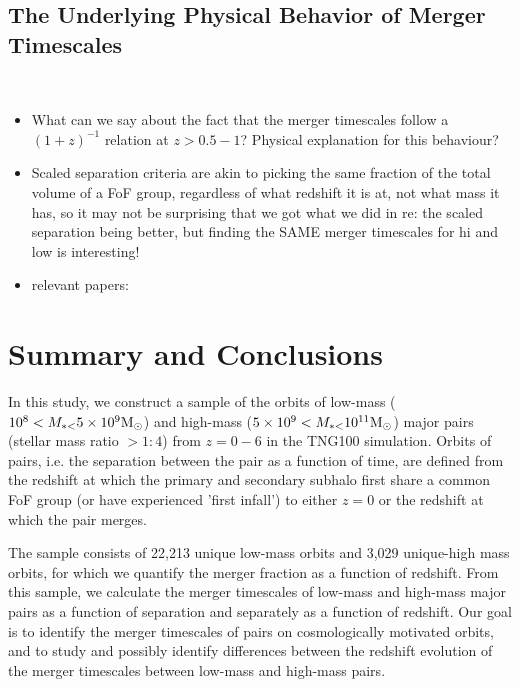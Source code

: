 \documentclass[twocolumn,linenumbers]{aastex631}
\begin{document}
   \subsection{The Underlying Physical Behavior of Merger Timescales}~\label{sec:disc-phys}


        \begin{itemize}
            \item What can we say about the fact that the merger timescales follow a $(1+z)^{-1}$ relation at $z>0.5-1$? Physical explanation for this behaviour? 
            \item Scaled separation criteria are akin to picking the same fraction of the total volume of a FoF group, regardless of what redshift it is at, not what mass it has, so it may not be surprising that we got what we did in re: the scaled separation being better, but finding the SAME merger timescales for hi and low is interesting!
            \item relevant papers: 
        \end{itemize}

    

   
    
\section{Summary and Conclusions}
    In this study, we construct a sample of the orbits of low-mass ($10^8 <M_{*{<}}5\times10^{9}\mathrm{M}_\odot$) and high-mass ($5\times10^{9}<M_{*{<}}10^{11}\mathrm{M}_\odot$) major pairs (stellar mass ratio $> 1:4$) from $z=0-6$ in the TNG100 simulation.
    Orbits of pairs, i.e. the separation between the pair as a function of time, are defined from the redshift at which the primary and secondary subhalo  first share a common FoF group (or have experienced 'first infall') to either $z=0$ or the redshift at which the pair merges.
    
    The sample consists of 22,213 unique low-mass orbits and 3,029 unique-high mass orbits, for which we quantify the merger fraction as a function of redshift.
    From this sample, we calculate the merger timescales of low-mass and high-mass major pairs as a function of separation and separately as a function of redshift. 
    Our goal is to identify the merger timescales of pairs on cosmologically motivated orbits, and to study and possibly identify differences between the redshift evolution of the merger timescales between low-mass and high-mass pairs. 
    
\end{document}
